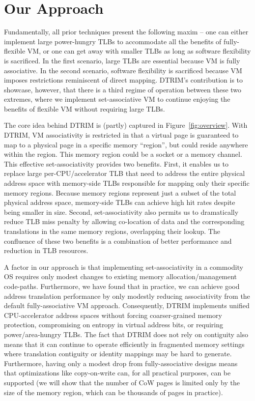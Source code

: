 \section{Our Approach}
\label{our-approach}
Fundamentally, all prior techniques present the following maxim -- one
can either implement large power-hungry TLBs to accommodate all the
benefits of fully-flexible VM, or one can get away with smaller TLBs
as long as software flexibility is sacrificed. In the first scenario,
large TLBs are essential because VM is fully associative. In the
second scenario, software flexibility is sacrificed because VM imposes
restrictions reminiscent of direct mapping. DTRIM's contribution is
to showcase, however, that there is a third regime of operation
between these two extremes, where we implement set-associative VM to
continue enjoying the benefits of flexible VM without requiring large
TLBs. 

The core idea behind DTRIM is (partly) captured in Figure~\ref{fig:overview}. With
DTRIM, VM associativity is restricted in that a virtual page is
guaranteed to map to a physical page in a specific memory
``region'', but could reside anywhere within the region. This memory region could be a socket or a memory
channel. This effective set-associativity provides two
benefits. First, it enables us to replace large per-CPU/accelerator
TLB that need to address the entire physical address space with
memory-side TLBs responsible for mapping only their specific memory
regions. Because memory regions represent just a subset of the total
physical address space, memory-side TLBs can achieve high hit rates
despite being smaller in size. Second, set-associativity also permits
us to dramatically reduce TLB miss penalty by allowing co-location of data and
the corresponding translations in the same memory regions, overlapping their
lookup. The confluence of these two benefits is a combination of
better performance and reduction in TLB resources. 

A factor in our approach is that implementing set-associativity in a
commodity OS requires only modest changes to existing memory
allocation/management code-paths. Furthermore, we have found that in
practice, we can achieve good address translation performance by only
modestly reducing associativity from the default fully-associative VM
approach. Consequently, DTRIM implements unified CPU-accelerator
address spaces without forcing coarser-grained memory protection,
compromising on entropy in virtual address bits, or requiring
power/area-hungry TLBs. The fact that DTRIM does not rely on
contiguity also means that it can continue to operate efficiently in
fragmented memory settings where translation contiguity or identity
mappings may be hard to generate. Furthermore, having only a modest drop
from fully-associative designs means that optimizations like
copy-on-write can, for all practical purposes, can be supported (we will
show that the number of CoW pages is limited only by the size of the
memory region, which can be thousands of pages in practice).


